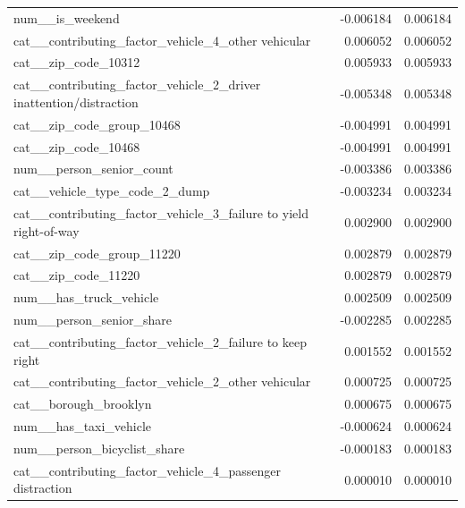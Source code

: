 \begin{tabular}{lrr}
num__is_weekend & -0.006184 & 0.006184 \\
cat__contributing_factor_vehicle_4_other vehicular & 0.006052 & 0.006052 \\
cat__zip_code_10312 & 0.005933 & 0.005933 \\
cat__contributing_factor_vehicle_2_driver inattention/distraction & -0.005348 & 0.005348 \\
cat__zip_code_group_10468 & -0.004991 & 0.004991 \\
cat__zip_code_10468 & -0.004991 & 0.004991 \\
num__person_senior_count & -0.003386 & 0.003386 \\
cat__vehicle_type_code_2_dump & -0.003234 & 0.003234 \\
cat__contributing_factor_vehicle_3_failure to yield right-of-way & 0.002900 & 0.002900 \\
cat__zip_code_group_11220 & 0.002879 & 0.002879 \\
cat__zip_code_11220 & 0.002879 & 0.002879 \\
num__has_truck_vehicle & 0.002509 & 0.002509 \\
num__person_senior_share & -0.002285 & 0.002285 \\
cat__contributing_factor_vehicle_2_failure to keep right & 0.001552 & 0.001552 \\
cat__contributing_factor_vehicle_2_other vehicular & 0.000725 & 0.000725 \\
cat__borough_brooklyn & 0.000675 & 0.000675 \\
num__has_taxi_vehicle & -0.000624 & 0.000624 \\
num__person_bicyclist_share & -0.000183 & 0.000183 \\
cat__contributing_factor_vehicle_4_passenger distraction & 0.000010 & 0.000010 \\
\bottomrule
\end{tabular}
